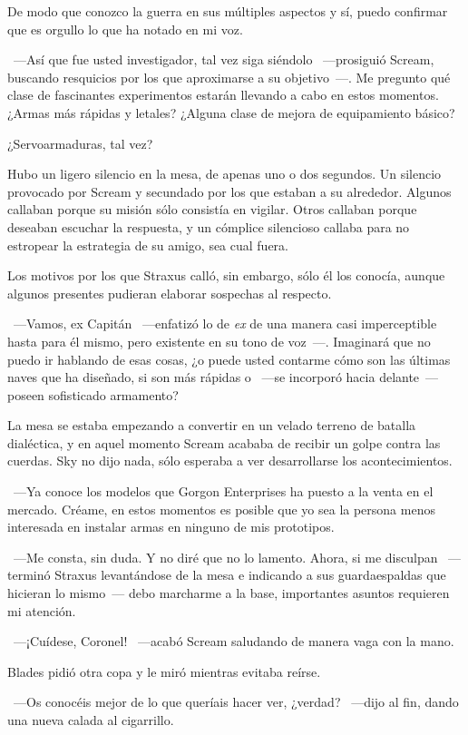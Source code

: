\rquoti De modo que conozco la guerra en sus múltiples aspectos y sí, puedo confirmar que es orgullo lo que ha notado en mi voz.

~---Así que fue usted investigador, tal vez siga siéndolo ~---prosiguió Scream, buscando resquicios por los que aproximarse a su objetivo~---. Me pregunto qué clase de fascinantes experimentos estarán llevando a cabo en estos momentos. ¿Armas más rápidas y letales? ¿Alguna clase de mejora de equipamiento básico?

\rquoti ¿Servoarmaduras, tal vez?

Hubo un ligero silencio en la mesa, de apenas uno o dos segundos. Un silencio provocado por Scream y secundado por los que estaban a su alrededor. Algunos callaban porque su misión sólo consistía en vigilar. Otros callaban porque deseaban escuchar la respuesta, y un cómplice silencioso callaba para no estropear la estrategia de su amigo, sea cual fuera.

Los motivos por los que Straxus calló, sin embargo, sólo él los conocía, aunque algunos presentes pudieran elaborar sospechas al respecto.

~---Vamos, ex Capitán ~---enfatizó lo de \emph{ex} de una manera casi imperceptible hasta para él mismo, pero existente en su tono de voz~---. Imaginará que no puedo ir hablando de esas cosas, ¿o puede usted contarme cómo son las últimas naves que ha diseñado, si son más rápidas o ~---se incorporó hacia delante~--- poseen sofisticado armamento?

La mesa se estaba empezando a convertir en un velado terreno de batalla dialéctica, y en aquel momento Scream acababa de recibir un golpe contra las cuerdas. Sky no dijo nada, sólo esperaba a ver desarrollarse los acontecimientos.

~---Ya conoce los modelos que Gorgon Enterprises ha puesto a la venta en el mercado. Créame, en estos momentos es posible que yo sea la persona menos interesada en instalar armas en ninguno de mis prototipos.

~---Me consta, sin duda. Y no diré que no lo lamento. Ahora, si me disculpan ~---terminó Straxus levantándose de la mesa e indicando a sus guardaespaldas que hicieran lo mismo~--- debo marcharme a la base, importantes asuntos requieren mi atención.

~---¡Cuídese, Coronel! ~---acabó Scream saludando de manera vaga con la mano.

Blades pidió otra copa y le miró mientras evitaba reírse.

~---Os conocéis mejor de lo que queríais hacer ver, ¿verdad? ~---dijo al fin, dando una nueva calada al cigarrillo.


